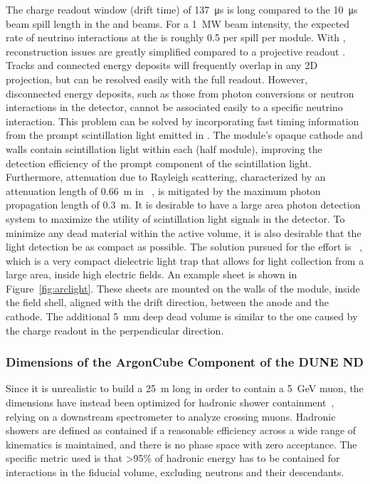 The charge readout window (drift time) of \SI{137}{\micro\second} is long compared to the \SI{10}{\micro\second}~\cite{Adamson:2015dkw} beam spill length in the  and  beams.
For a \SI{1}{MW} beam intensity, the expected rate of neutrino interactions at the   is roughly 0.5 per spill per  module.  
With , reconstruction issues are greatly simplified compared to a projective readout .
Tracks and connected energy deposits will frequently overlap in any 2D projection, but can be resolved easily with the full \threed readout.
However, disconnected energy deposits, such as those from photon conversions or neutron interactions in the detector, cannot be associated easily to a specific neutrino interaction.
This problem can be solved by incorporating fast timing information from the prompt scintillation light emitted in .
The module's opaque cathode and walls contain scintillation light within each  (half module), improving the detection efficiency of the prompt component of the scintillation light. 
Furthermore, attenuation due to Rayleigh scattering, characterized by an attenuation length of \SI{0.66}{\metre} in ~\cite{Grace:2015yta}, is mitigated by the maximum photon propagation length of \SI{0.3}{\metre}. 
It is desirable to have a large area photon detection system to maximize the utility of scintillation light signals in the detector. 
To minimize any dead material within the active volume, it is also desirable that the light detection be as compact as possible. 
The solution pursued for the  effort is ~\cite{Auger:2017flc}, which is a very compact dielectric light trap that allows for light collection from a large area, inside high electric fields. 
An example  sheet is shown in Figure~\ref{fig:arclight}. These sheets are mounted on the walls of the module, inside the field shell, aligned with the drift direction, between the anode and the cathode. 
The additional \SI{5}{\milli\metre} deep dead volume is similar to the one caused by the charge readout in the perpendicular direction.

\subsubsection{Dimensions of the ArgonCube Component of the DUNE  ND}\label{sec:had_containment}

Since it is unrealistic to build a \SI{25}{\metre} long  in order to contain a \SI{5}{\giga\electronvolt} muon, the  dimensions have instead been optimized for hadronic shower containment~\cite{lartpcSizeChris}, relying on a downstream spectrometer to analyze crossing muons.
Hadronic showers are defined as contained if a reasonable efficiency across a wide range of kinematics is maintained, and there is no phase space with zero acceptance. 
The specific metric used is that \textgreater95\% of hadronic energy has to be contained for interactions in the fiducial volume, excluding neutrons and their descendants.

